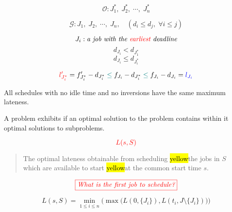 \begin{frame}{}
  \begin{quote}
    \centering
    {\Large {}}
  \end{quote}

\end{frame}

\begin{frame}{}
  \begin{center}
  \end{center}

  \[
    \mathcal{O}: J_{1}^{\ast},\; J_{2}^{\ast},\; \cdots,\; J_{n}^{\ast}
  \]

  \[
    \mathcal{G}: J_1,\; J_2,\; \cdots,\; J_n, \quad (d_i \le d_j,\; \forall i \le j)
  \]
\end{frame}

\begin{frame}{}
  \[
    J_i: \text{\it a job with the \textcolor{red}{earliest} deadline}
  \]
  \[
    d_{J_i} < d_{J_{1}^{\ast}}
  \]
  \[
    d_{J_i} \le d_{J_{i}^{\ast}}
  \]


  \pause
  \[
    \textcolor{red}{l'_{J_{i}^{\ast}}} = f'_{J_{i}^{\ast}} - d_{J_{i}^{\ast}} \;\textcolor{teal}{\le}\; f_{J_{i}} - d_{J_{i}^{\ast}} \;\textcolor{teal}{\le}\; f_{J_{i}} - d_{J_{i}} = \textcolor{blue}{l_{J_{i}}}
  \]
\end{frame}

\begin{frame}{}
  \begin{theorem}
    All schedules with no idle time and no inversions have the same maximum lateness.
  \end{theorem}
\end{frame}

\begin{frame}{}
  \begin{theorem}
    A problem exhibits \emph{} if
    an optimal solution to the problem contains within it optimal solutions to subproblems.
  \end{theorem}

  \pause
  \[
    \textcolor{red}{L(s, S)}
  \]

  \begin{quote}
    \centering
    {The optimal lateness obtainable from scheduling \hl{yellow}{the jobs in $S$}} \\[6pt]
    {which are available to start \hl{yellow}{at the common start time $s$}}. 
  \end{quote}

  \pause
  \[
    \textcolor{red}{\fbox{\it What is the first job to schedule?}}
  \]

  \[
    L(s, S) = \min_{1 \le i \le n} \Big(\max\big(L(0, \{J_i\}), L(t_i, J \setminus \{J_i\})\big)\Big)
  \]
\end{frame}

